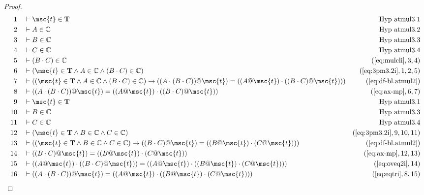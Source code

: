 \begin{proof}
\begin{align}
  1 &&  & \vdash \msc{t} \in \mathbf{T}&\text{Hyp~atmul3.1}\notag%
  \\ 2 &&  & \vdash A \in \mathbb{C}&\text{Hyp~atmul3.2}\notag%
  \\ 3 &&  & \vdash B \in \mathbb{C}&\text{Hyp~atmul3.3}\notag%
  \\ 4 &&  & \vdash C \in \mathbb{C}&\text{Hyp~atmul3.4}\notag%
  \\ 5 &&  & \vdash ( B \cdot C ) \in \mathbb{C}&(\mbox{\ref{eq:mulcli}},3,4)\notag
  \\ 6 &&  & \vdash ( \msc{t} \in \mathbf{T} \wedge A \in \mathbb{C} \wedge ( B \cdot C ) \in \mathbb{C} )&(\mbox{\ref{eq:3pm3.2i}},1,2,5)\notag
  \\ 7 &&  & \vdash ( ( \msc{t} \in \mathbf{T} \wedge A \in \mathbb{C} \wedge ( B \cdot C ) \in \mathbb{C} ) \rightarrow ( ( A \cdot ( B \cdot C ) ) @ \msc{t} ) = ( ( A @ \msc{t} ) \cdot ( ( B \cdot C ) @ \msc{t} ) ) )&(\mbox{\ref{eq:df-bl.atmul2}})\notag
  \\ 8 &&  & \vdash ( ( A \cdot ( B \cdot C ) ) @ \msc{t} ) = ( ( A @ \msc{t} ) \cdot ( ( B \cdot C ) @ \msc{t} ) )&(\mbox{\ref{eq:ax-mp}},6,7)\notag
  \\ 9 &&  & \vdash \msc{t} \in \mathbf{T}&\text{Hyp~atmul3.1}\notag%
  \\ 10 &&  & \vdash B \in \mathbb{C}&\text{Hyp~atmul3.3}\notag%
  \\ 11 &&  & \vdash C \in \mathbb{C}&\text{Hyp~atmul3.4}\notag%
  \\ 12 &&  & \vdash ( \msc{t} \in \mathbf{T} \wedge B \in \mathbb{C} \wedge C \in \mathbb{C} )&(\mbox{\ref{eq:3pm3.2i}},9,10,11)\notag
  \\ 13 &&  & \vdash ( ( \msc{t} \in \mathbf{T} \wedge B \in \mathbb{C} \wedge C \in \mathbb{C} ) \rightarrow ( ( B \cdot C ) @ \msc{t} ) = ( ( B @ \msc{t} ) \cdot ( C @ \msc{t} ) ) )&(\mbox{\ref{eq:df-bl.atmul2}})\notag
  \\ 14 &&  & \vdash ( ( B \cdot C ) @ \msc{t} ) = ( ( B @ \msc{t} ) \cdot ( C @ \msc{t} ) )&(\mbox{\ref{eq:ax-mp}},12,13)\notag
  \\ 15 &&  & \vdash ( ( A @ \msc{t} ) \cdot ( ( B \cdot C ) @ \msc{t} ) ) = ( ( A @ \msc{t} ) \cdot ( ( B @ \msc{t} ) \cdot ( C @ \msc{t} ) ) )&(\mbox{\ref{eq:oveq2i}},14)\notag
  \\ 16 &&  & \vdash ( ( A \cdot ( B \cdot C ) ) @ \msc{t} ) = ( ( A @ \msc{t} ) \cdot ( ( B @ \msc{t} ) \cdot ( C @ \msc{t} ) ) )&(\mbox{\ref{eq:eqtri}},8,15)\notag
\end{align}
\end{proof}

